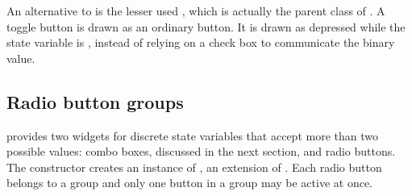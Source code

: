 An alternative to  is the lesser used
, which is actually the parent class of
. A toggle button is drawn as an ordinary
button. It is drawn as depressed while the state variable is ,
instead of relying on a check box to communicate the binary value.

\subsection{Radio button groups}
\label{sec:RGtk2:gtkRadioButton}

\GTK\/ provides two widgets for discrete state variables that accept
more than two possible values: combo boxes, discussed in the next
section, and radio buttons. The  constructor
creates an instance of , an extension of
. Each radio button belongs to a group and only
one button in a group may be active at once.

